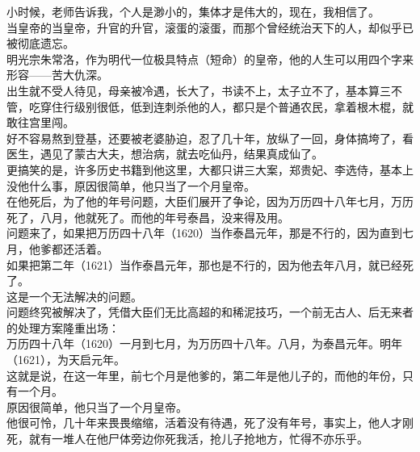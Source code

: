 \begin{multicols}{\theparacolNo}
小时候，老师告诉我，个人是渺小的，集体才是伟大的，现在，我相信了。\\

当皇帝的当皇帝，升官的升官，滚蛋的滚蛋，而那个曾经统治天下的人，却似乎已被彻底遗忘。\\

明光宗朱常洛，作为明代一位极具特点（短命）的皇帝，他的人生可以用四个字来形容——苦大仇深。\\

出生就不受人待见，母亲被冷遇，长大了，书读不上，太子立不了，基本算三不管，吃穿住行级别很低，低到连刺杀他的人，都只是个普通农民，拿着根木棍，就敢往宫里闯。\\

好不容易熬到登基，还要被老婆胁迫，忍了几十年，放纵了一回，身体搞垮了，看医生，遇见了蒙古大夫，想治病，就去吃仙丹，结果真成仙了。\\

更搞笑的是，许多历史书籍到他这里，大都只讲三大案，郑贵妃、李选侍，基本上没他什么事，原因很简单，他只当了一个月皇帝。\\

在他死后，为了他的年号问题，大臣们展开了争论，因为万历四十八年七月，万历死了，八月，他就死了。而他的年号泰昌，没来得及用。\\

问题来了，如果把万历四十八年（1620）当作泰昌元年，那是不行的，因为直到七月，他爹都还活着。\\

如果把第二年（1621）当作泰昌元年，那也是不行的，因为他去年八月，就已经死了。\\

这是一个无法解决的问题。\\

问题终究被解决了，凭借大臣们无比高超的和稀泥技巧，一个前无古人、后无来者的处理方案隆重出场：\\

万历四十八年（1620）一月到七月，为万历四十八年。八月，为泰昌元年。明年（1621），为天启元年。\\

这就是说，在这一年里，前七个月是他爹的，第二年是他儿子的，而他的年份，只有一个月。\\

原因很简单，他只当了一个月皇帝。\\

他很可怜，几十年来畏畏缩缩，活着没有待遇，死了没有年号，事实上，他人才刚死，就有一堆人在他尸体旁边你死我活，抢儿子抢地方，忙得不亦乐乎。\\


\end{multicols}
